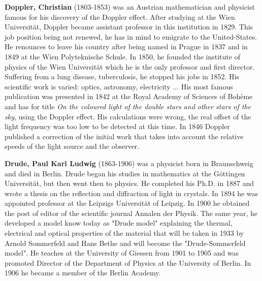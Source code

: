 \textbf{Doppler, Christian} (1803-1853) was an Austrian mathematician and physicist famous for his discovery of the Doppler effect. After studying at the Wien Universität, Doppler became assistant professor in this institution in 1829. This job position being not renewed, he has in mind to emigrate to the United-States. He renounces to leave his country after being named in Prague in 1837 and in 1849 at the Wien Polyteknische Schule. In 1850, he founded the institute of physics of the Wien Universität which he is the only professor and first director. Suffering from a lung disease, tuberculosis, he stopped his jobs in 1852. His scientific work is varied: optics, astronomy, electricity ... His most famous publication was presented in 1842 at the Royal Academy of Sciences of Bohème and has for title \textit{On the coloured light of the double stars and other stars of the sky}, using the Doppler effect. His calculations were wrong, the real offset of the light frequency was too low to be detected at this time. In 1846 Doppler published a correction of the initial work that takes into account the relative speeds of the light source and the observer.

\textbf{Drude, Paul Karl Ludwig} (1863-1906) was a physicist born in Braunschweig and died in Berlin. Drude began his studies in mathematics at the Göttingen Universität, but then went then to physics. He completed his Ph.D. in 1887 and wrote a thesis on the reflection and diffraction of light in crystals. In 1894 he was appointed professor at the Leipzigs Universität of Leipzig. In 1900 he obtained the post of editor of the scientific journal Annalen der Physik. The same year, he developed a model know today as "Drude model" explaining the thermal, electrical and optical properties of the material that will be taken in 1933 by Arnold Sommerfeld and Hans Bethe and will become the "Drude-Sommerfeld model". He teaches at the University of Giessen from 1901 to 1905 and was promoted Director of the Department of Physics at the University of Berlin. In 1906 he became a member of the Berlin Academy.

{}	

